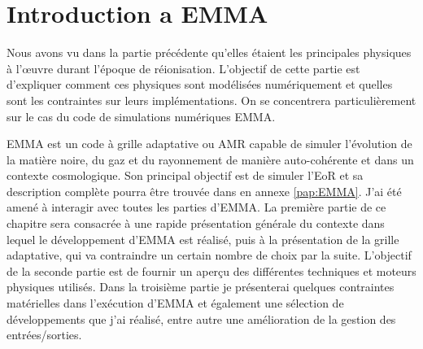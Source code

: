 \chapter{Introduction a EMMA}
\label{ch:introduction}


Nous avons vu dans la partie précédente qu'elles étaient les principales physiques à l’œuvre durant l'époque de réionisation.
L'objectif de cette partie est d'expliquer comment ces physiques sont modélisées numériquement et quelles sont les contraintes sur leurs implémentations.
On se concentrera particulièrement sur le cas du code de simulations numériques EMMA.

EMMA est un code à grille adaptative ou \ac{AMR} capable de simuler l'évolution de la matière noire, du gaz et du rayonnement de manière auto-cohérente et dans un contexte cosmologique.
Son principal objectif est de simuler l'\ac{EoR} et sa description complète pourra être trouvée dans \cite{aubert_emma:_2015} en annexe \ref{pap:EMMA}.
J'ai été amené à interagir avec toutes les parties d'EMMA.
La première partie de ce chapitre sera consacrée à une rapide présentation générale du contexte dans lequel le développement d'EMMA est réalisé, puis à la présentation de la grille adaptative, qui va contraindre un certain nombre de choix par la suite.
L'objectif de la seconde partie est de fournir un aperçu des différentes techniques et moteurs physiques utilisés.%
Dans la troisième partie je présenterai quelques contraintes matérielles dans l'exécution d'EMMA et également une sélection de développements que j'ai réalisé, entre autre une amélioration de la gestion des entrées/sorties.



